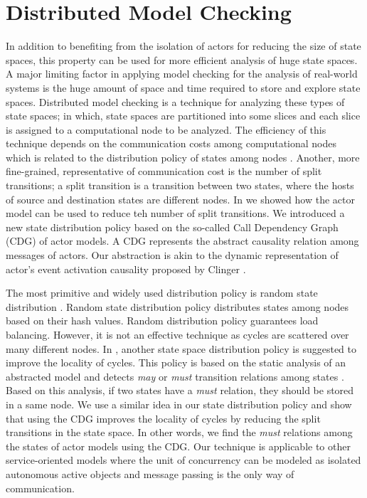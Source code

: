 \section{Distributed Model Checking} \label{sec::DMC}
In addition to benefiting from the isolation of actors for reducing the size of state spaces, this property can be used for more efficient analysis of huge state spaces. A major limiting factor in applying model checking for the analysis of real-world systems is the huge amount of space and time required to store and explore state spaces. Distributed model checking is a technique for analyzing these types of state spaces; in which, state spaces are partitioned into some slices and each slice is assigned to a computational node to be analyzed. The efficiency of this technique depends on the communication costs among computational nodes which is related to the distribution policy of states among nodes \cite{DBLP:journals/entcs/OrzanPE05}. Another, more fine-grained, representative of communication cost is the number of split transitions; a split transition is a transition between two states,  where the hosts of source and destination states are different nodes. In \cite{DBLP:journals/eceasst/KhamespanahSMSR15} we showed how the actor model can be used to reduce teh number of split transitions. We introduced a new state distribution policy based on the so-called Call Dependency Graph (CDG) of actor models. A CDG represents the abstract causality relation among messages of actors. Our abstraction is akin to the dynamic representation of actor's event activation causality proposed by Clinger \cite{clinger}. 

The most primitive and widely used distribution policy is random state distribution \cite{DBLP:journals/entcs/GaravelMS13}. Random state distribution policy distributes states among nodes based on their hash values. Random distribution policy guarantees load balancing. However, it is not an effective technique as cycles are scattered over many different nodes. In \cite{DBLP:journals/entcs/OrzanPE05}, another state space distribution policy is suggested to improve the locality of cycles. This policy is based on the static analysis of an abstracted model and detects \emph{may} or \emph{must} transition relations among states \cite{DBLP:conf/lics/LarsenT88}. Based on this analysis, if two states have a \emph{must} relation, they should be stored in a same node. We use a similar idea in our state distribution policy and show that using the CDG improves the locality of cycles by reducing the split transitions in the state space. In other words, we find the \emph{must} relations among the states of actor models using the CDG. Our technique is applicable to other service-oriented models where the unit of concurrency can be modeled as isolated autonomous active objects and message passing is the only way of communication. 

